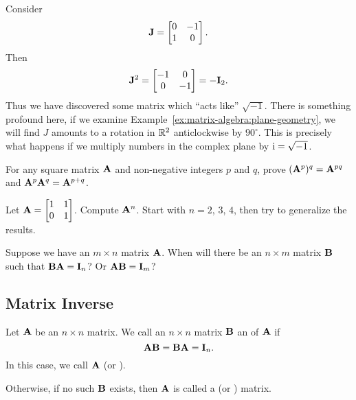 \begin{example}
  Consider
  \begin{equation}
\mathbf{J} = \begin{bmatrix}0 & -1\\1 & 0
\end{bmatrix}.
  \end{equation}
  Then
  \begin{equation}
    \mathbf{J}^{2} = \begin{bmatrix}-1 & 0\\
      0 & -1
    \end{bmatrix} = -\mathbf{I}_{2}.
  \end{equation}
  Thus we have discovered some matrix which ``acts like'' $\sqrt{-1}$.
There is something profound here, if we examine Example~\ref{ex:matrix-algebra:plane-geometry},
we will find $J$ amounts to a rotation in $\mathbb{R}^{2}$ anticlockwise by
$90^{\circ}$. This is precisely what happens if we multiply numbers in
the complex plane by $\mathrm{i}=\sqrt{-1}$.
\end{example}

\begin{problem}
  For any square matrix $\mathbf{A}$ and non-negative integers $p$ and $q$,
  prove $(\mathbf{A}^{p})^{q} = \mathbf{A}^{pq}$
  and $\mathbf{A}^{p}\mathbf{A}^{q}=\mathbf{A}^{p+q}$.
\end{problem}

\begin{problem}
Let $\displaystyle\mathbf{A}=\begin{bmatrix}1 & 1\\0 & 1 \end{bmatrix}$.
Compute $\mathbf{A}^{n}$. Start with $n=2$, $3$, $4$, then try to
generalize the results.
\end{problem}

Suppose we have an $m\times n$ matrix $\mathbf{A}$. When will there be an
$n\times m$ matrix $\mathbf{B}$ such that $\mathbf{B}\mathbf{A}=\mathbf{I}_{n}$? Or
$\mathbf{A}\mathbf{B}=\mathbf{I}_{m}$?

\subsection{Matrix Inverse}

\begin{definition}
Let $\mathbf{A}$ be an $n\times n$ matrix.
We call an $n\times n$ matrix $\mathbf{B}$ an  of $\mathbf{A}$
if
\begin{equation}
\mathbf{A}\mathbf{B}=\mathbf{B}\mathbf{A}=\mathbf{I}_{n}.
\end{equation}
In this case, we call $\mathbf{A}$  (or ).

Otherwise, if no such $\mathbf{B}$ exists, then $\mathbf{A}$ is called a
 (or ) matrix.
\end{definition}

